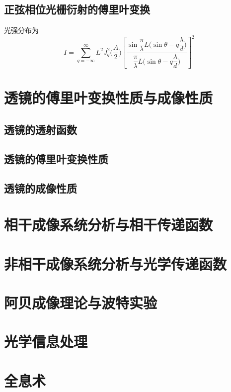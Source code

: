 \documentclass[cn,10pt,chinesefont=founder,math=mtpro2,cite=super,toc=onecol,twoside]{elegantbook}
\begin{document}
\subsection{正弦相位光栅衍射的傅里叶变换}

光强分布为
\begin{equation}
I=\sum_{q=-\infty}^{\infty}L^2J_q^2\bigg(\frac{A}{2}\bigg)\left[\frac{\sin\dfrac{\pi}{\lambda}L\bigg(\sin\theta-q\dfrac{\lambda}{d}\bigg)}{\dfrac{\pi}{\lambda}L\bigg(\sin\theta-q\dfrac{\lambda}{d}\bigg)}\right]^2
\end{equation}

\section{透镜的傅里叶变换性质与成像性质}
\subsection{透镜的透射函数}

\subsection{透镜的傅里叶变换性质}

\subsection{透镜的成像性质}

\section{相干成像系统分析与相干传递函数}

\section{非相干成像系统分析与光学传递函数}

\section{阿贝成像理论与波特实验}

\section{光学信息处理}

\section{全息术}
\end{document}
